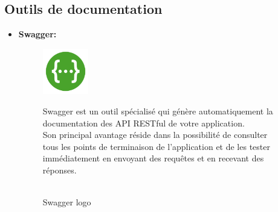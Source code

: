     \subsection{Outils de documentation}
        \begin{itemize}
        
            \item \textbf{Swagger: }
                    \begin{figure}[!htb]\centering
                    \begin{minipage}{0.30\textwidth}
                    \centering
                        {\includegraphics[width = 2cm , height=2cm]{img/techno/swagger.png}}
                        \caption{\\ Swagger logo \cite{swagger}}\label{Fig:Data1}
                    \end{minipage}
                    \begin{minipage}{0.60\textwidth}
                        \par Swagger est un outil spécialisé qui génère automatiquement la documentation des API RESTful de votre application. \\ 
                        Son principal avantage réside dans la possibilité de consulter tous les points de terminaison de l'application et de les tester immédiatement en envoyant des requêtes et en recevant des réponses\cite{swagger}.\\
                        

\end{minipage}
\end{figure}
\end{itemize}
